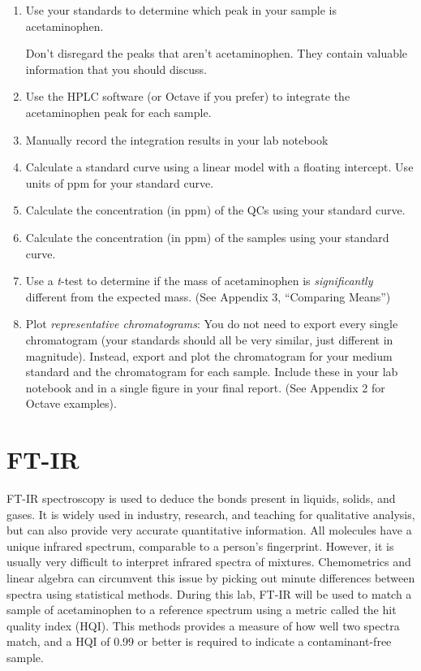 \documentclass[]{tufte-book}
\providecommand{\tightlist}{%
  \setlength{\itemsep}{0pt}\setlength{\parskip}{0pt}}
\begin{document}
\begin{enumerate}
\def\labelenumi{\arabic{enumi}.}
\tightlist
\item
  Use your standards to determine which peak in your sample is acetaminophen.

  \begin{marginfigure}
    Don't disregard the peaks that aren't acetaminophen. They contain
    valuable information that you should discuss.
    \end{marginfigure}
\item
  Use the HPLC software (or Octave if you prefer) to integrate the acetaminophen peak for each sample.
\item
  Manually record the integration results in your lab notebook
\item
  Calculate a standard curve using a linear model with a floating intercept. Use units of ppm for your standard curve.
\item
  Calculate the concentration (in ppm) of the QCs using your standard curve.
\item
  Calculate the concentration (in ppm) of the samples using your standard curve.
\item
  Use a \emph{t}-test to determine if the mass of acetaminophen is \emph{significantly} different from the expected mass. (See Appendix 3, ``Comparing Means'')
\item
  Plot \emph{representative chromatograms}: You do not need to export every single chromatogram (your standards should all be very similar, just different in magnitude). Instead, export and plot the chromatogram for your medium standard and the chromatogram for each sample. Include these in your lab notebook and in a single figure in your final report. (See Appendix 2 for Octave examples).
\end{enumerate}

\newpage

\hypertarget{ft-ir-1}{%
\section{FT-IR}\label{ft-ir-1}}

FT-IR spectroscopy is used to deduce the bonds present in liquids, solids, and gases. It is widely used in industry, research, and teaching for qualitative analysis, but can also provide very accurate quantitative information. All molecules have a unique infrared spectrum, comparable to a person's fingerprint. However, it is usually very difficult to interpret infrared spectra of mixtures. Chemometrics and linear algebra can circumvent this issue by picking out minute differences between spectra using statistical methods. During this lab, FT-IR will be used to match a sample of acetaminophen to a reference spectrum using a metric called the hit quality index (HQI). This methods provides a measure of how well two spectra match, and a HQI of 0.99 or better is required to indicate a contaminant-free sample.
\end{document}
